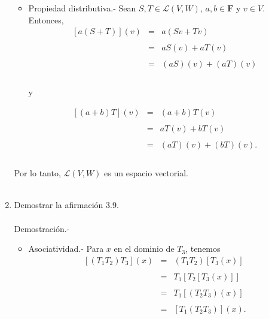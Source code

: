 \begin{enumerate}[\bfseries 1.]
\begin{itemize}
		\item Propiedad distributiva.- Sean $S,T\in \mathcal{L}(V,W)$, $a,b\in \textbf{F}$ y $v\in V$. Entonces,
		    $$
		    \begin{array}{rcl}
			\left[a(S+T)\right](v) &=& a(Sv+Tv)\\\\
					       &=& aS(v)+aT(v)\\\\
					       &=& (aS)(v)+(aT)(v)\\\\
		    \end{array}
		    $$
		    \begin{center}
			y
		    \end{center}

		    $$
		    \begin{array}{rcl}
			\left[(a+b)T\right](v) &=& (a+b)T(v)\\\\
					       &=& aT(v)+bT(v)\\\\
					       &=& (aT)(v)+(bT)(v).\\\\
		    \end{array}
		    $$
		    
	    \end{itemize}

	    Por lo tanto, $\mathcal{L}(V,W)$ es un espacio vectorial.\\\\

	\item  Demostrar la afirmación 3.9.\\\\
	    Demostración.-\; 
	    \begin{itemize}
		\item Asociatividad.- Para $x$ en el dominio de $T_3$, tenemos
		    $$
		    \begin{array}{rcl}
			\left[(T_1T_2)T_3\right](x) &=& (T_1T_2)\left[T_3(x)\right]\\\\
						    &=& T_1\left[T_2\left[T_3(x)\right]\right]\\\\
						    &=& T_1\left[(T_2T_3)(x)\right]\\\\
						    &=& \left[T_1(T_2T_3)\right](x).
		    \end{array}
		    $$


\end{itemize}
\end{enumerate}
